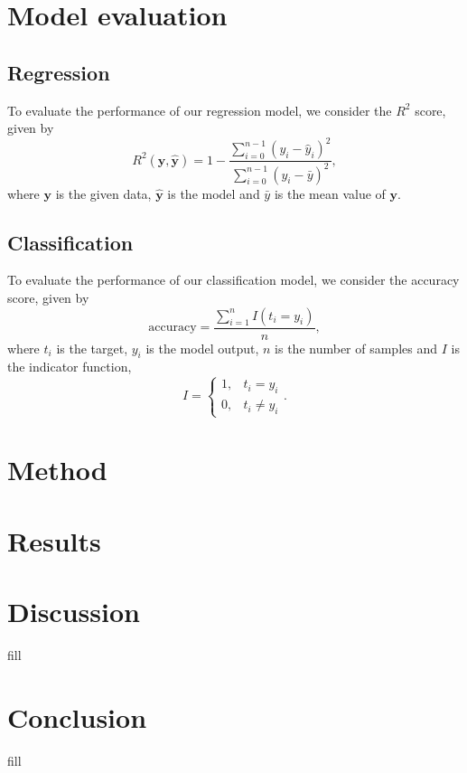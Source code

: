 \documentclass[a4paper, 11pt, twocolumn]{article}
\begin{document}
\section{Model evaluation}
\subsection{Regression}
To evaluate the performance of our regression model, we consider the $R^2$ score, given by 
\begin{equation}
    R^2(\bm{y}, \bm{\hat{y}}) = 1 - \frac{\sum_{i=0}^{n - 1} (y_i - \hat{y}_i)^2}{\sum_{i=0}^{n - 1} (y_i - \bar{y})^2},
    \label{eq:R2}
\end{equation}
where $\bm{y}$ is the given data, $\bm{\hat{y}}$ is the model and ${\bar{y}}$ is the mean value of $\bm{y}$.
\subsection{Classification}
To evaluate the performance of our classification model, we consider the accuracy score, given by 
\begin{equation}
\label{eq:accuracy}
\text{accuracy}=\frac{\sum_{i=1}^nI(t_i=y_i)}{n},
\end{equation}
where $t_i$ is the target, $y_i$ is the model output, $n$ is the number of samples and $I$ is the indicator function, 
\[
I = \begin{cases} 
1, & t_i = y_i\\
0, & t_i \neq y_i
\end{cases} .
\]

\section{Method}




\section{Results}
\the \columnwidth


\section{Discussion}
fill
\section{Conclusion}
fill


\end{document}
